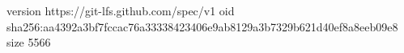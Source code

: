 version https://git-lfs.github.com/spec/v1
oid sha256:aa4392a3bf7fccac76a33338423406e9ab8129a3b7329b621d40ef8a8eeb09e8
size 5566
